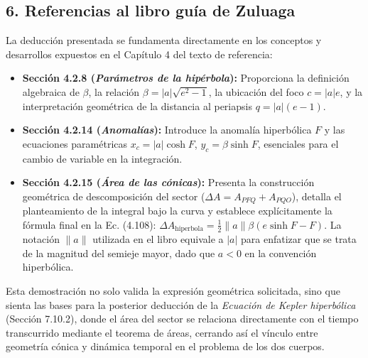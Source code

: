 \documentclass[12pt, a4paper]{article}
\begin{document}
\subsection*{6. Referencias al libro guía de Zuluaga}
La deducción presentada se fundamenta directamente en los conceptos y desarrollos expuestos en el Capítulo 4 del texto de referencia:
\begin{itemize}
    \item \textbf{Sección 4.2.8 (\textit{Parámetros de la hipérbola}):} Proporciona la definición algebraica de $\beta$, la relación $\beta = |a|\sqrt{e^2-1}$, la ubicación del foco $c = |a|e$, y la interpretación geométrica de la distancia al periapsis $q = |a|(e-1)$.
    \item \textbf{Sección 4.2.14 (\textit{Anomalías}):} Introduce la anomalía hiperbólica $F$ y las ecuaciones paramétricas $x_c = |a|\cosh F$, $y_c = \beta\sinh F$, esenciales para el cambio de variable en la integración.
    \item \textbf{Sección 4.2.15 (\textit{Área de las cónicas}):} Presenta la construcción geométrica de descomposición del sector ($\Delta A = A_{PFQ} + A_{PQO}$), detalla el planteamiento de la integral bajo la curva y establece explícitamente la fórmula final en la Ec. (4.108): $\Delta A_{\text{hiperbola}} = \frac{1}{2}\|a\|\beta(e\sinh F - F)$. La notación $\|a\|$ utilizada en el libro equivale a $|a|$ para enfatizar que se trata de la magnitud del semieje mayor, dado que $a < 0$ en la convención hiperbólica.
\end{itemize}
Esta demostración no solo valida la expresión geométrica solicitada, sino que sienta las bases para la posterior deducción de la \textit{Ecuación de Kepler hiperbólica} (Sección 7.10.2), donde el área del sector se relaciona directamente con el tiempo transcurrido mediante el teorema de áreas, cerrando así el vínculo entre geometría cónica y dinámica temporal en el problema de los dos cuerpos.
\end{document}
